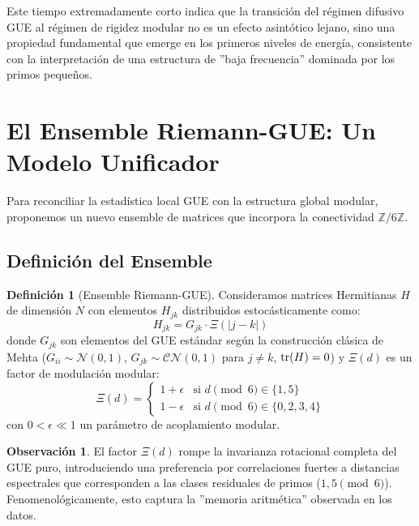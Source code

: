 \documentclass[12pt, a4paper]{article}
\theoremstyle{plain}
\theoremstyle{definition}
\newtheorem{definicion}[teorema]{Definición}
\newtheorem{observacion}[teorema]{Observación}
\newcommand{\Z}{\mathbb{Z}}
\begin{document}
Este tiempo extremadamente corto indica que la transición del régimen difusivo GUE al régimen de rigidez modular no es un efecto asintótico lejano, sino una propiedad fundamental que emerge en los primeros niveles de energía, consistente con la interpretación de una estructura de ''baja frecuencia'' dominada por los primos pequeños.

\section{El Ensemble Riemann-GUE: Un Modelo Unificador}

Para reconciliar la estadística local GUE con la estructura global modular, proponemos un nuevo ensemble de matrices que incorpora la conectividad $\Z/6\Z$.

\subsection{Definición del Ensemble}

\begin{definicion}[Ensemble Riemann-GUE]
Consideramos matrices Hermitianas $H$ de dimensión $N$ con elementos $H_{jk}$ distribuidos estocásticamente como:
\[
H_{jk} = G_{jk} \cdot \Xi(|j-k|)
\]
donde $G_{jk}$ son elementos del GUE estándar según la construcción clásica de Mehta \cite{mehta2004} ($G_{ii} \sim \mathcal{N}(0,1)$, $G_{jk} \sim \mathcal{CN}(0,1)$ para $j \neq k$, $\tr(H)=0$) y $\Xi(d)$ es un factor de modulación modular:
\[
\Xi(d) = 
\begin{cases} 
1 + \epsilon & \text{si } d \pmod 6 \in \{1, 5\} \\
1 - \epsilon & \text{si } d \pmod 6 \in \{0, 2, 3, 4\}
\end{cases}
\]
con $0 < \epsilon \ll 1$ un parámetro de acoplamiento modular.
\end{definicion}

\begin{observacion}
El factor $\Xi(d)$ rompe la invarianza rotacional completa del GUE puro, introduciendo una preferencia por correlaciones fuertes a distancias espectrales que corresponden a las clases residuales de primos ($1,5 \pmod{6}$). Fenomenológicamente, esto captura la ''memoria aritmética'' observada en los datos.
\end{observacion}
\end{document}
